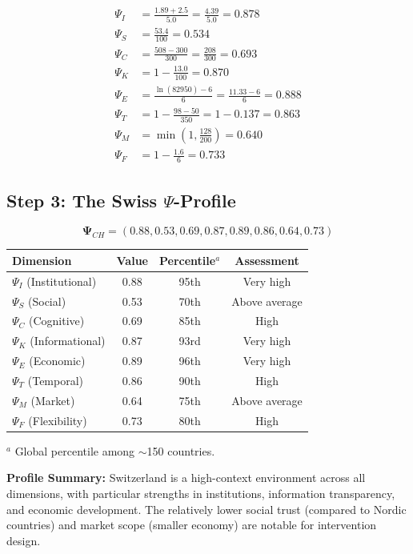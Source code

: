 \begin{align*}
\Psi_I &= \frac{1.89 + 2.5}{5.0} = \frac{4.39}{5.0} = 0.878 \\
\Psi_S &= \frac{53.4}{100} = 0.534 \\
\Psi_C &= \frac{508 - 300}{300} = \frac{208}{300} = 0.693 \\
\Psi_K &= 1 - \frac{13.0}{100} = 0.870 \\
\Psi_E &= \frac{\ln(82950) - 6}{6} = \frac{11.33 - 6}{6} = 0.888 \\
\Psi_T &= 1 - \frac{98 - 50}{350} = 1 - 0.137 = 0.863 \\
\Psi_M &= \min\left(1, \frac{128}{200}\right) = 0.640 \\
\Psi_F &= 1 - \frac{1.6}{6} = 0.733
\end{align*}

\subsection{Step 3: The Swiss $\Psi$-Profile}

\begin{tcolorbox}[colback=green!5!white, colframe=green!75!black, 
    title=\textbf{Switzerland $\Psi$-Profile (2023)}]

\[
\boldsymbol{\Psi}_{CH} = (0.88, 0.53, 0.69, 0.87, 0.89, 0.86, 0.64, 0.73)
\]

\begin{center}
\begin{tabular}{@{}lccc@{}}
\toprule
\textbf{Dimension} & \textbf{Value} & \textbf{Percentile$^a$} & \textbf{Assessment} \\
\midrule
$\Psi_I$ (Institutional) & 0.88 & 95th & Very high \\
$\Psi_S$ (Social) & 0.53 & 70th & Above average \\
$\Psi_C$ (Cognitive) & 0.69 & 85th & High \\
$\Psi_K$ (Informational) & 0.87 & 93rd & Very high \\
$\Psi_E$ (Economic) & 0.89 & 96th & Very high \\
$\Psi_T$ (Temporal) & 0.86 & 90th & High \\
$\Psi_M$ (Market) & 0.64 & 75th & Above average \\
$\Psi_F$ (Flexibility) & 0.73 & 80th & High \\
\bottomrule
\end{tabular}
\end{center}

\footnotesize $^a$ Global percentile among $\sim$150 countries.

\textbf{Profile Summary:} Switzerland is a high-context environment across 
all dimensions, with particular strengths in institutions, information 
transparency, and economic development. The relatively lower social trust 
(compared to Nordic countries) and market scope (smaller economy) are 
notable for intervention design.

\end{tcolorbox}

